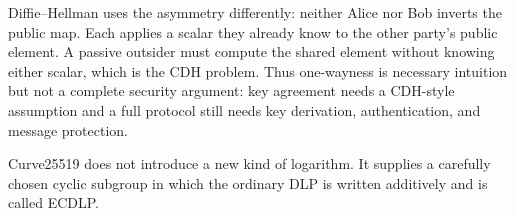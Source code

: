 Diffie--Hellman uses the asymmetry differently: neither Alice nor Bob inverts
the public map. Each applies a scalar they already know to the other party's
public element. A passive outsider must compute the shared element without
knowing either scalar, which is the CDH problem. Thus one-wayness is necessary
intuition but not a complete security argument: key agreement needs a
CDH-style assumption and a full protocol still needs key derivation,
authentication, and message protection.

\begin{takeaway}
Curve25519 does not introduce a new kind of logarithm. It supplies a carefully
chosen cyclic subgroup in which the ordinary DLP is written additively and is
called ECDLP.
\end{takeaway}

